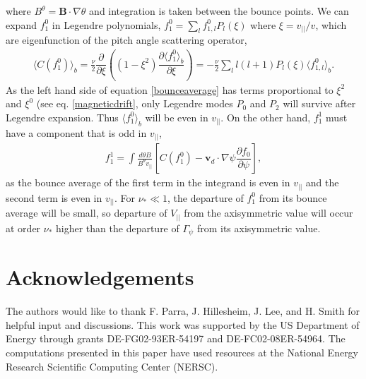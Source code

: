 \documentclass{article}
\newcommand{\partder}[2]{\dfrac{\partial  #1}{\partial  #2}} %
\begin{document}
where $B^{\theta} = \bm{B} \cdot \nabla \theta$ and integration is taken between the bounce points. We can expand $f_1^0$ in Legendre polynomials, $f_1^0 = \sum_l f_{1,l}^0 P_l(\xi)$ where $\xi = v_{||}/v$, which are eigenfunction of the pitch angle scattering operator, 
\begin{gather}
\langle C(f_1^0) \rangle_b = \frac{\nu}{2} \partder{}{\xi} \left( \left(1 - \xi^2\right) \partder{\langle f^0_1\rangle_b}{\xi}  \right) = -\frac{\nu}{2} \sum_l l(l+1)  P_l(\xi) \langle f_{1,l}^0 \rangle_b.
\end{gather}
As the left hand side of equation \ref{bounceaverage} has terms proportional to $\xi^2$ and $\xi^0$ (see eq. \ref{magneticdrift}, only Legendre modes $P_0$ and $P_2$ will survive after Legendre expansion. Thus $\langle f_1^0 \rangle_b$ will be even in $v_{||}$. On the other hand, $f_{1}^1$ must have a component that is odd in $v_{||}$,
\begin{gather}
f_{1}^1 = \int \frac{d \theta B}{B^{\theta} v_{||}} \left[C(f_1^0) - \bm{v}_d \cdot \nabla \psi \partder{f_0}{\psi} \right],
\end{gather}
as the bounce average of the first term in the integrand is even in $v_{||}$ and the second term is even in $v_{||}$.
For $\nu_* \ll 1$, the departure of $f_1^0$ from its bounce average will be small, so departure of $V_{||}$ from the axisymmetric value will occur at order $\nu_*$ higher than the departure of $\Gamma_{\psi}$ from its axisymmetric value. 

\section{Acknowledgements}
The authors would like to thank F. Parra, J. Hillesheim, J. Lee, and H. Smith for helpful input and discussions. This work was supported by the US Department of Energy through grants DE-FG02-93ER-54197 and DE-FC02-08ER-54964. The computations presented in this paper have used resources at the National Energy Research Scientific Computing Center (NERSC). 


\small

\end{document}

